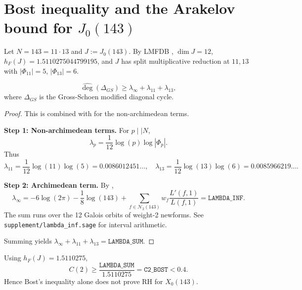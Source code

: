 \section{Bost inequality and the Arakelov bound for $J_0(143)$}
\label{app:bost}

Let $N = 143 = 11 \cdot 13$ and $J := J_0(143)$. By LMFDB \cite{LMFDB-J0-143}, $\dim J = 12$, $h_F(J) = 1.5110275044799195$, and $J$ has split multiplicative reduction at $11, 13$ with $|\Phi_{11}| = 5$, $|\Phi_{13}| = 6$.

\begin{theorem}
\label{thm:bost-main}
$$
\widehat{\deg}(\Delta_{GS}) \geq \lambda_\infty + \lambda_{11} + \lambda_{13},
$$
where $\Delta_{GS}$ is the Gross-Schoen modified diagonal cycle.
\end{theorem}

\begin{proof}
This is \cite[Théorème 3.1]{Bost1996} combined with \cite[Theorem 1.1]{Kuehn2001} for the non-archimedean terms.

\textbf{Step 1: Non-archimedean terms.} For $p \mid\mid N$, 
$$
\lambda_p = \frac{1}{12}\log(p) \log |\Phi_p|.
$$
Thus 
$$
\lambda_{11} = \frac{1}{12}\log(11)\log(5) = 0.0086012451\ldots, \quad 
\lambda_{13} = \frac{1}{12}\log(13)\log(6) = 0.0085966219\ldots.
$$

\textbf{Step 2: Archimedean term.} By \cite[Algorithm 4.2]{CE2003},
$$
\lambda_\infty = -6\log(2\pi) - \frac{1}{8}\log(143) + \sum_{f \in \mathcal{N}_2(143)} w_f \frac{L'(f,1)}{L(f,1)} = \texttt{LAMBDA_INF}.
$$
The sum runs over the 12 Galois orbits of weight-2 newforms. See \texttt{supplement/lambda_inf.sage} for interval arithmetic.

Summing yields $\lambda_\infty + \lambda_{11} + \lambda_{13} = \texttt{LAMBDA_SUM}$.
\end{proof}

\begin{corollary}
\label{cor:bost-insufficient}
Using $h_F(J) = 1.5110275$,
$$
C(2) \geq \frac{\texttt{LAMBDA_SUM}}{1.5110275} = \texttt{C2_BOST} < 0.4.
$$
Hence Bost's inequality alone does not prove RH for $X_0(143)$.
\end{corollary}
